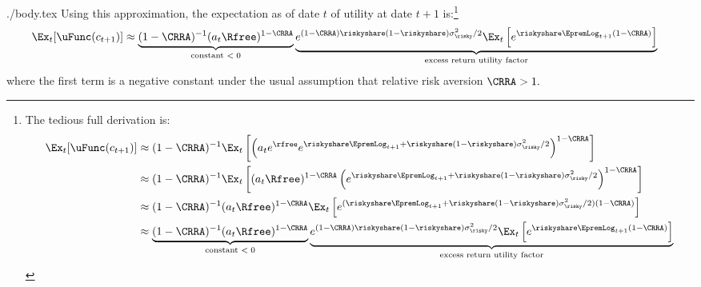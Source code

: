 \documentclass{\handout}
\begin{document}
\begin{verbatimwrite}{./body.tex}
Using this approximation, the expectation as of date $t$ of utility at date $t+1$ is:\footnote{The tedious full derivation is: 
  \begin{equation}\begin{split}
  \Ex_{t}[\uFunc(c_{t+1})] & \approx  (1-\CRRA)^{-1}\Ex_{t}\left[\left(a_{t}e^{\rfree}e^{\riskyshare \EpremLog_{t+1}+\riskyshare(1-\riskyshare)\sigma^{2}_{\risky}/2 }\right)^{1-\CRRA}\right] \notag
\\                      & \approx  (1-\CRRA)^{-1}\Ex_{t}\left[(a_{t}\Rfree)^{1-\CRRA}\left( e^{\riskyshare \EpremLog_{t+1}+\riskyshare(1-\riskyshare)\sigma^{2}_{\risky}/2 }\right)^{1-\CRRA}\right] 
\\                      & \approx  (1-\CRRA)^{-1}(a_{t}\Rfree)^{1-\CRRA}\Ex_{t}\left[e^{(\riskyshare \EpremLog_{t+1}+\riskyshare(1-\riskyshare)\sigma^{2}_{\risky}/2)  (1-\CRRA)}\right] 
\\                      & \approx  \underbrace{(1-\CRRA)^{-1}(a_{t}\Rfree)^{1-\CRRA}}_{\text{constant $< 0$}}\underbrace{e^{ (1-\CRRA)\riskyshare(1-\riskyshare)\sigma^{2}_{\risky}/2}\Ex_{t}\left[e^{\riskyshare \EpremLog_{t+1}  (1-\CRRA)}\right]}_{\text{excess return utility factor}}
 \end{split}
  \end{equation}
}
\begin{equation}\label{eq:exputil}\begin{split}
  \Ex_{t}[\uFunc(c_{t+1})] & \approx  \underbrace{(1-\CRRA)^{-1}(a_{t}\Rfree)^{1-\CRRA}}_{\text{constant $< 0$}}\underbrace{e^{ (1-\CRRA)\riskyshare(1-\riskyshare)\sigma^{2}_{\risky}/2}\Ex_{t}\left[e^{\riskyshare \EpremLog_{t+1}  (1-\CRRA)}\right]}_{\text{excess return utility factor}}
 \end{split}
  \end{equation}
where the first term is a negative constant under the usual assumption that relative risk aversion $\CRRA>1.$


\end{verbatimwrite}
\end{document}
